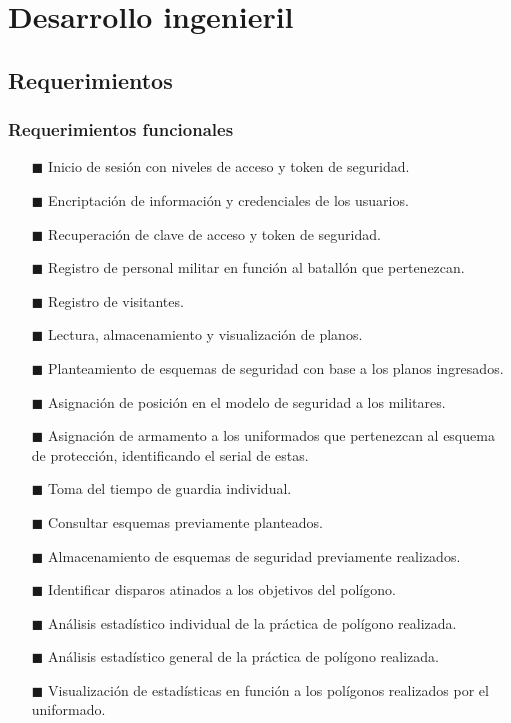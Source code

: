 \documentclass[conference]{IEEEtran}
\begin{document}
\section{Desarrollo ingenieril}

\subsection{Requerimientos}
\subsubsection{Requerimientos funcionales}
\begin{itemize}
	\item[$\blacksquare$] Inicio de sesión con niveles de acceso y token de seguridad.
	\item[$\blacksquare$] Encriptación de información y credenciales de los usuarios. 
	\item[$\blacksquare$] Recuperación de clave de acceso y token de seguridad.
	\item[$\blacksquare$] Registro de personal militar en función al batallón que pertenezcan.
	\item[$\blacksquare$] Registro de visitantes.
	\item[$\blacksquare$] Lectura, almacenamiento y visualización de planos.
	\item[$\blacksquare$] Planteamiento de esquemas de seguridad con base a los planos ingresados.
	\item[$\blacksquare$] Asignación de posición en el modelo de seguridad a los militares.
	\item[$\blacksquare$] Asignación de armamento a los uniformados que pertenezcan al esquema de protección, identificando el serial de estas.
	\item[$\blacksquare$] Toma del tiempo de guardia individual.
	\item[$\blacksquare$] Consultar esquemas previamente planteados.
	\item[$\blacksquare$] Almacenamiento de esquemas de seguridad previamente realizados.
	\item[$\blacksquare$] Identificar disparos atinados a los objetivos del polígono.
	\item[$\blacksquare$] Análisis estadístico individual de la práctica de polígono realizada.
	\item[$\blacksquare$] Análisis estadístico general de la práctica de polígono realizada.
	\item[$\blacksquare$] Visualización de estadísticas en función a los polígonos realizados por el uniformado.
\end{itemize}
\end{document}
